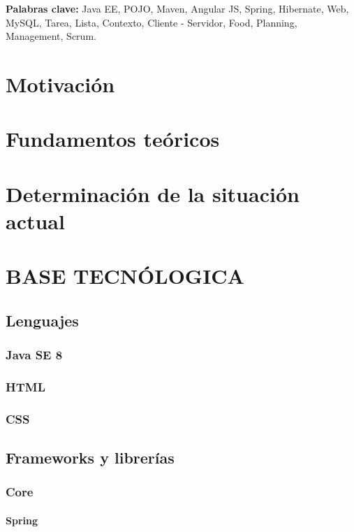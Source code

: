 \documentclass[12pt, a4paper, twoside]{book}
\begin{document}
	
	\textbf{Palabras clave:} Java EE, POJO, Maven, Angular JS, Spring, Hibernate, Web, MySQL, Tarea, Lista, Contexto, Cliente - Servidor, Food, Planning, Management, Scrum. 
	
	
	\renewcommand{\contentsname}{Índice de contenidos}
	\renewcommand{\listfigurename}{Índice de figuras}
	\renewcommand{\listtablename}{Índice de tablas}
	
	\tableofcontents %
	
	\listoffigures %
	
	\listoftables %
	
	\clearpage
	
	\chapter{Motivación}	
	\chapter{Fundamentos teóricos}
	\chapter{Determinación de la situación actual}
	\chapter{BASE TECNÓLOGICA}
	\section{Lenguajes}
	\subsection{Java SE 8}
	\subsection{HTML}
	\subsection{CSS}
	\section{Frameworks y librerías}
	\subsection{Core}
	\subsubsection{Spring}
\end{document}
